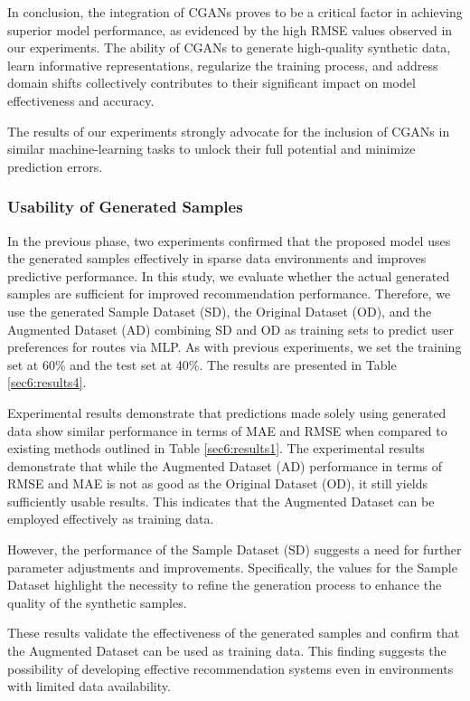 \documentclass[]{article}
\begin{document}
In conclusion, the integration of CGANs proves to be a critical factor in achieving superior model performance, as evidenced by the high RMSE values observed in our experiments. The ability of CGANs to generate high-quality synthetic data, learn informative representations, regularize the training process, and address domain shifts collectively contributes to their significant impact on model effectiveness and accuracy.

The results of our experiments strongly advocate for the inclusion of CGANs in similar machine-learning tasks to unlock their full potential and minimize prediction errors.

\subsubsection{Usability of Generated Samples}
In the previous phase, two experiments confirmed that the proposed model uses the generated samples effectively in sparse data environments and improves predictive performance. In this study, we evaluate whether the actual generated samples are sufficient for improved recommendation performance. Therefore, we use the generated Sample Dataset (SD), the Original Dataset (OD), and the Augmented Dataset (AD) combining SD and OD as training sets to predict user preferences for routes via MLP. As with previous experiments, we set the training set at 60\% and the test set at 40\%. The results are presented in Table \ref{sec6:results4}.

Experimental results demonstrate that predictions made solely using generated data show similar performance in terms of MAE and RMSE when compared to existing methods outlined in Table \ref{sec6:results1}. 
The experimental results demonstrate that while the Augmented Dataset (AD) performance in terms of RMSE and MAE is not as good as the Original Dataset (OD), it still yields sufficiently usable results. This indicates that the Augmented Dataset can be employed effectively as training data.

However, the performance of the Sample Dataset (SD) suggests a need for further parameter adjustments and improvements. Specifically, the values for the Sample Dataset highlight the necessity to refine the generation process to enhance the quality of the synthetic samples.

These results validate the effectiveness of the generated samples and confirm that the Augmented Dataset can be used as training data. This finding suggests the possibility of developing effective recommendation systems even in environments with limited data availability.
\end{document}
